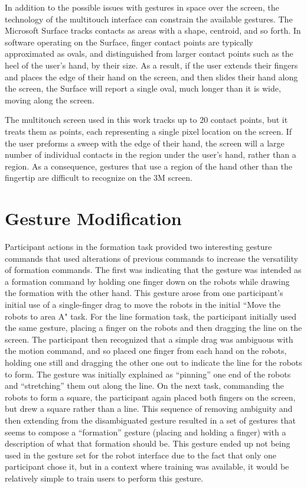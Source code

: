 In addition to the possible issues with gestures in space over the screen, the technology of the multitouch interface can constrain the available gestures. 
The Microsoft Surface tracks contacts as areas with a shape, centroid, and so forth. 
In software operating on the Surface, finger contact points are typically approximated as ovals, and distinguished from larger contact points such as the heel of the user's hand, by their size. 
As a result, if the user extends their fingers and places the edge of their hand on the screen, and then slides their hand along the screen, the Surface will report a single oval, much longer than it is wide, moving along the screen. 

The multitouch screen used in this work tracks up to 20 contact points, but it treats them as points, each representing a single pixel location on the screen. 
If the user preforms a sweep with the edge of their hand, the screen will a large number of individual contacts in the region under the user's hand, rather than a region.
As a consequence, gestures that use a region of the hand other than the fingertip are difficult to recognize on the 3M screen. 

\section{Gesture Modification}

Participant actions in the formation task provided two interesting gesture commands that used alterations of previous commands to increase the versatility of formation commands. 
The first was indicating that the gesture was intended as a formation command by holding one finger down on the robots while drawing the formation with the other hand. 
This gesture arose from one participant's initial use of a single-finger drag to move the robots in the initial ``Move the robots to area A" task. 
For the line formation task, the participant initially used the same gesture, placing a finger on the robots and then dragging the line on the screen. 
The participant then recognized that a simple drag was ambiguous with the motion command, and so placed one finger from each hand on the robots, holding one still and dragging the other one out to indicate the line for the robots to form. 
The gesture was initially explained as ``pinning'' one end of the robots and ``stretching'' them out along the line.
On the next task, commanding the robots to form a square, the participant again placed both fingers on the screen, but drew a square rather than a line. 
This sequence of removing ambiguity and then extending from the disambiguated gesture resulted in a set of gestures that seems to compose a ``formation'' gesture (placing and holding a finger) with a description of what that formation should be. 
This gesture ended up not being used in the gesture set for the robot interface due to the fact that only one participant chose it, but in a context where training was available, it would be relatively simple to train users to perform this gesture. 

